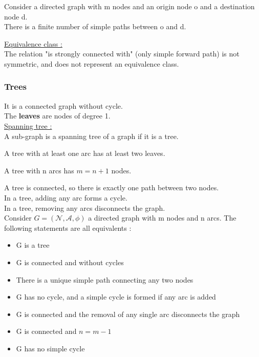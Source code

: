 \documentclass[../main.tex]{subfiles}
\begin{document}
\begin{theoremen}
    Consider a directed graph with m nodes and an origin node o and a destination node d. \\
    There is a finite number of simple paths between o and d.\\
\end{theoremen}

\quad \underline{Equivalence class :}\\
The relation "is strongly connected with" (only simple forward path) is not symmetric, and does not represent an equivalence class.\\

\subsubsection{Trees}
It is a connected graph without cycle.\\

The \textbf{leaves} are nodes of degree 1.\\

\quad \underline{Spanning tree :}\\
A sub-graph is a spanning tree of a graph if it is a tree.\\

\begin{theoremen}
    A tree with at least one arc has at least two leaves.\\
\end{theoremen}


\begin{theoremen}
    A tree with n arcs has $m=n+1$ nodes.\\
\end{theoremen}

A tree is connected, so there is exactly one path between two nodes.\\
In a tree, adding any arc forms a cycle.\\
In a tree, removing any arcs disconnects the graph.\\

Consider $G = (\mathcal{N},\mathcal{A},\phi)$ a directed graph with m nodes and n arcs. The following statements are all equivalents : \begin{itemize}
    \item G is a tree\\
    \item G is connected and without cycles\\
    \item There is a unique simple path connecting any two nodes\\
    \item G has no cycle, and a simple cycle is formed if any arc is added\\
    \item G is connected and the removal of any single arc disconnects the graph\\
    \item G is connected and $n=m-1$\\
    \item G has no simple cycle\\
\end{itemize}
\end{document}
